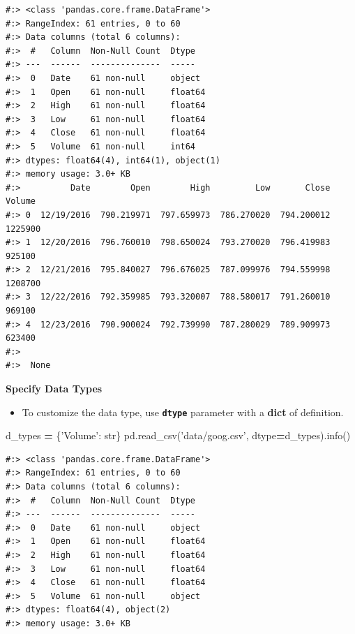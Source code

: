 \documentclass[
]{book}
\newenvironment{Shaded}{\begin{snugshade}}{\end{snugshade}}
\newcommand{\BuiltInTok}[1]{#1}
\newcommand{\NormalTok}[1]{#1}
\newcommand{\OperatorTok}[1]{\textcolor[rgb]{0.43,0.43,0.43}{\textbf{#1}}}
\newcommand{\StringTok}[1]{\textcolor[rgb]{0.5,0.5,0.5}{#1}}
\providecommand{\tightlist}{%
  \setlength{\itemsep}{0pt}\setlength{\parskip}{0pt}}
\begin{document}
\begin{verbatim}
#:> <class 'pandas.core.frame.DataFrame'>
#:> RangeIndex: 61 entries, 0 to 60
#:> Data columns (total 6 columns):
#:>  #   Column  Non-Null Count  Dtype  
#:> ---  ------  --------------  -----  
#:>  0   Date    61 non-null     object 
#:>  1   Open    61 non-null     float64
#:>  2   High    61 non-null     float64
#:>  3   Low     61 non-null     float64
#:>  4   Close   61 non-null     float64
#:>  5   Volume  61 non-null     int64  
#:> dtypes: float64(4), int64(1), object(1)
#:> memory usage: 3.0+ KB
#:>          Date        Open        High         Low       Close   Volume
#:> 0  12/19/2016  790.219971  797.659973  786.270020  794.200012  1225900
#:> 1  12/20/2016  796.760010  798.650024  793.270020  796.419983   925100
#:> 2  12/21/2016  795.840027  796.676025  787.099976  794.559998  1208700
#:> 3  12/22/2016  792.359985  793.320007  788.580017  791.260010   969100
#:> 4  12/23/2016  790.900024  792.739990  787.280029  789.909973   623400 
#:> 
#:>  None
\end{verbatim}

\textbf{Specify Data Types}

\begin{itemize}
\tightlist
\item
  To customize the data type, use \textbf{\texttt{dtype}} parameter with a \textbf{dict} of definition.
\end{itemize}

\begin{Shaded}
\begin{Highlighting}[]
\NormalTok{d_types }\OperatorTok{=}\NormalTok{ \{}\StringTok{'Volume'}\NormalTok{: }\BuiltInTok{str}\NormalTok{\}}
\NormalTok{pd.read_csv(}\StringTok{'data/goog.csv'}\NormalTok{, dtype}\OperatorTok{=}\NormalTok{d_types).info()}
\end{Highlighting}
\end{Shaded}

\begin{verbatim}
#:> <class 'pandas.core.frame.DataFrame'>
#:> RangeIndex: 61 entries, 0 to 60
#:> Data columns (total 6 columns):
#:>  #   Column  Non-Null Count  Dtype  
#:> ---  ------  --------------  -----  
#:>  0   Date    61 non-null     object 
#:>  1   Open    61 non-null     float64
#:>  2   High    61 non-null     float64
#:>  3   Low     61 non-null     float64
#:>  4   Close   61 non-null     float64
#:>  5   Volume  61 non-null     object 
#:> dtypes: float64(4), object(2)
#:> memory usage: 3.0+ KB
\end{verbatim}
\end{document}
